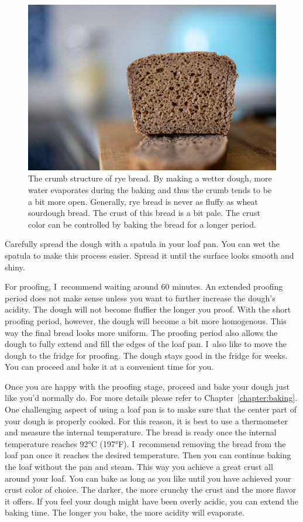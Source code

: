 \begin{figure}[!htb]
  \includegraphics[width=\textwidth]{crumb}
  \caption{The crumb structure of rye bread. By making a wetter
  dough, more water evaporates during the baking and thus the
  crumb tends to be a bit more open. Generally, rye
  bread is never as fluffy as wheat sourdough bread. The crust
  of this bread is a bit pale. The crust color can be controlled
  by baking the bread for a longer period.}%
  \label{fig:rye-crumb}
\end{figure}

Carefully spread the dough with a spatula in your loaf pan. You
can wet the spatula to make this process easier. Spread it
until the surface looks smooth and shiny.

For proofing, I~recommend waiting around 60 minutes. An extended
proofing period does not make sense unless you want to further
increase the dough's acidity. The dough will not become fluffier
the longer you proof. With the short proofing period, however,
the dough will become a bit more homogenous. This way the final
bread looks more uniform. The proofing period also allows the
dough to fully extend and fill the edges of the loaf pan. I~also
like to move the dough to the fridge for proofing. The dough stays
good in the fridge for weeks. You can proceed and bake it at a
convenient time for you. 

Once you are happy with the proofing stage, proceed and bake your dough
just like you'd normally do. For more details please refer to 
Chapter~\ref{chapter:baking}. One challenging aspect
of using a loaf pan is to make sure that the center part of your
dough is properly cooked. For this reason, it is best to use a thermometer
and measure the internal temperature. The bread is
ready once the internal temperature reaches 92°C (197°F). I~recommend
removing the bread from the loaf pan once it reaches the desired
temperature. Then you can continue baking the loaf without the pan and
steam. This way you achieve a great crust all around your
loaf. You can bake as long as you like until you have achieved
your crust color of choice. The darker, the more crunchy
the crust and the more flavor it offers. If you feel your
dough might have been overly acidic, you can extend the baking time.
The longer you bake, the more acidity will evaporate.

